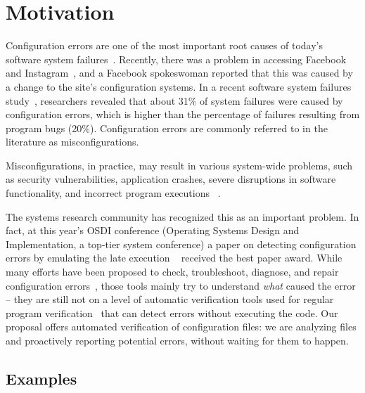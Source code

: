 \section{Motivation}
\label{sec:intro}

Configuration errors are one of the most important root causes of
today's software system failures~\cite{xu15systems, yin11anempirical}.
Recently, there was a problem in accessing  
Facebook and Instagram~\cite{mashableNews}, 
and a Facebook spokeswoman reported that 
this was caused by a change to the site's configuration systems.
In a recent software system failures study~\cite{yin11anempirical},
researchers revealed that about 31\% of system failures were caused by 
configuration errors, which is higher than the percentage of
failures resulting from program bugs (20\%). 
Configuration errors are commonly referred to in the literature 
as misconfigurations. 

Misconfigurations, in practice, may result in various
system-wide problems, such as security vulnerabilities, 
application crashes, severe disruptions in software
functionality, and incorrect program executions%
~\cite{zhang14encore, yuan11context, xu13do, xu15hey}. 

The systems research community has recognized this as an important
problem. In fact, at this year's OSDI conference (Operating Systems
Design and Implementation, a top-tier system conference) a paper on
detecting configuration errors by emulating the late execution
 ~\cite{xu16early} received the best paper 
award. While many efforts have been proposed to check, troubleshoot, diagnose, and repair configuration errors~\cite{attariyan10automating,
su07autobash, whitaker04configuration},
those tools mainly try to understand {\emph{what}} caused the 
error -- they are still not on a level of
automatic verification tools used for regular program 
verification~\cite{Leino10Dafny, PiskacWZ14, BobotFMP15} that can
detect errors without executing the code. Our proposal offers 
automated verification of configuration files: we are analyzing 
files and proactively reporting potential errors, without waiting for them to happen.

\subsection{Examples}
\label{sec:intro-examples}

